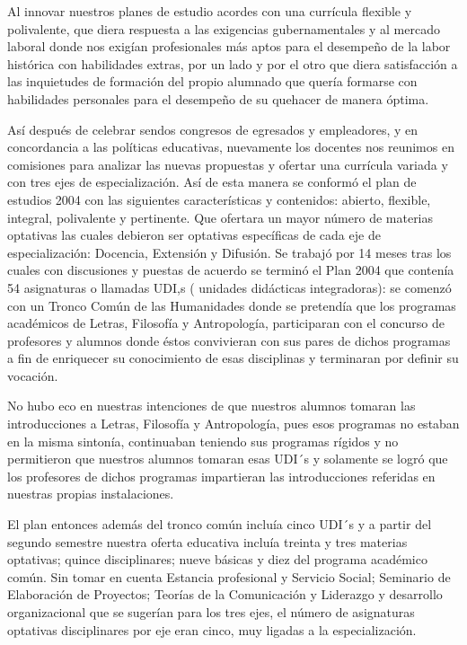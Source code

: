 Al innovar nuestros planes de estudio acordes con una currícula 
flexible y polivalente, que diera respuesta a las exigencias 
gubernamentales y al mercado laboral donde nos exigían profesionales 
más aptos para el desempeño de la labor histórica con habilidades 
extras, por un lado y por el otro que diera satisfacción a las 
inquietudes de formación del propio alumnado que quería formarse con 
habilidades personales para el desempeño de su quehacer de manera 
óptima.

Así después de celebrar sendos congresos de egresados y empleadores, y 
en concordancia a las políticas educativas, nuevamente los docentes nos 
reunimos en comisiones para analizar las nuevas propuestas y ofertar 
una currícula variada y con tres ejes de especialización. Así de esta 
manera se conformó el plan de estudios 2004 con las siguientes 
características y contenidos: abierto, flexible, integral, polivalente 
y pertinente. Que ofertara un mayor número de materias optativas las 
cuales debieron ser optativas específicas de cada eje de 
especialización: Docencia, Extensión y Difusión. Se trabajó por 14 
meses tras los cuales con discusiones y puestas de acuerdo se terminó 
el Plan 2004 que contenía 54 asignaturas o llamadas UDI,s ( unidades 
didácticas integradoras): se comenzó con un Tronco Común de las 
Humanidades donde se pretendía que los programas académicos de Letras, 
Filosofía y Antropología, participaran con el concurso de profesores y 
alumnos donde éstos convivieran con sus pares de dichos programas a fin 
de enriquecer su conocimiento de esas disciplinas y terminaran por 
definir su vocación.


No hubo eco en nuestras intenciones de que nuestros alumnos tomaran las 
introducciones a Letras, Filosofía y Antropología, pues esos programas 
no estaban en la misma sintonía, continuaban teniendo sus programas 
rígidos y no permitieron que nuestros alumnos tomaran esas UDI´s y 
solamente se logró que los profesores de dichos programas impartieran 
las introducciones referidas en nuestras propias instalaciones.

El plan entonces además del tronco común incluía cinco UDI´s y a partir 
del segundo semestre nuestra oferta educativa incluía treinta y tres 
materias optativas; quince disciplinares; nueve básicas y diez del 
programa académico común. Sin tomar en cuenta Estancia profesional y 
Servicio Social; Seminario de Elaboración de Proyectos; Teorías de la 
Comunicación y Liderazgo y desarrollo organizacional que se sugerían 
para los tres ejes, el número de asignaturas optativas disciplinares 
por eje eran cinco, muy ligadas a la especialización.  

